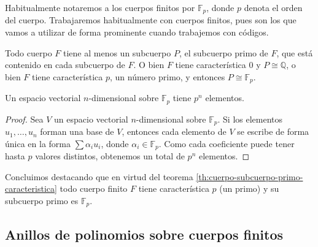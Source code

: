 Habitualmente notaremos a los cuerpos finitos por \(\mathbb F_p\), donde \(p\) denota el orden del cuerpo.
Trabajaremos habitualmente con cuerpos finitos, pues son los que vamos a utilizar de forma prominente cuando trabajemos con códigos.

\begin{theorem}
  \label{th:cuerpo-subcuerpo-primo-caracteristica}
  Todo cuerpo \(F\) tiene al menos un subcuerpo \(P\), el subcuerpo primo de \(F\), que está contenido en cada subcuerpo de \(F\).
  O bien \(F\) tiene característica \(0\) y \(P \cong \mathbb Q\), o bien \(F\) tiene característica \(p\), un número primo, y entonces \(P \cong \mathbb F_p\).
\end{theorem}




\begin{lemma}
  Un espacio vectorial \(n\)-dimensional sobre \(\mathbb F_p\) tiene \(p^n\) elementos.
\end{lemma}

\begin{proof}
  Sea \(V\) un espacio vectorial \(n\)-dimensional sobre \(\mathbb F_p\).
  Si los elementos \(u_1, \dots, u_n\) forman una base de \(V\), entonces cada elemento de \(V\) se escribe de forma única en la forma \(\sum \alpha_iu_i\), donde \(\alpha_i \in \mathbb F_p\).
  Como cada coeficiente puede tener hasta \(p\) valores distintos, obtenemos un total de \(p^n\) elementos.
\end{proof}

Concluimos destacando que en virtud del teorema \ref{th:cuerpo-subcuerpo-primo-caracteristica} todo cuerpo finito \(F\) tiene característica \(p\) (un primo) y su subcuerpo primo es \(\mathbb F_p\).

\subsection{Anillos de polinomios sobre cuerpos finitos}

